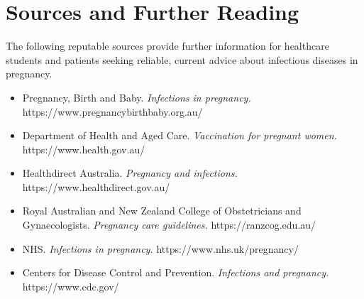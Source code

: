 \section*{Sources and Further Reading}
The following reputable sources provide further information for healthcare students and patients seeking reliable, current advice about infectious diseases in pregnancy.
\begin{itemize}
    \item Pregnancy, Birth and Baby. \textit{Infections in pregnancy.} https://www.pregnancybirthbaby.org.au/
    \item Department of Health and Aged Care. \textit{Vaccination for pregnant women.} https://www.health.gov.au/
    \item Healthdirect Australia. \textit{Pregnancy and infections.} https://www.healthdirect.gov.au/
    \item Royal Australian and New Zealand College of Obstetricians and Gynaecologists. \textit{Pregnancy care guidelines.} https://ranzcog.edu.au/
    \item NHS. \textit{Infections in pregnancy.} https://www.nhs.uk/pregnancy/
    \item Centers for Disease Control and Prevention. \textit{Infections and pregnancy.} https://www.cdc.gov/
\end{itemize}
